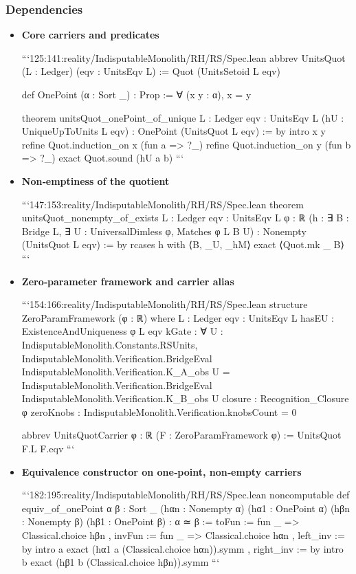 \documentclass{article}
\begin{document}
\subsubsection{Dependencies}
\begin{itemize}[leftmargin=*]
  \item \textbf{Core carriers and predicates}

```125:141:reality/IndisputableMonolith/RH/RS/Spec.lean
abbrev UnitsQuot (L : Ledger) (eqv : UnitsEqv L) := Quot (UnitsSetoid L eqv)

def OnePoint (α : Sort _) : Prop := ∀ (x y : α), x = y

theorem unitsQuot_onePoint_of_unique {L : Ledger} {eqv : UnitsEqv L}
  (hU : UniqueUpToUnits L eqv) : OnePoint (UnitsQuot L eqv) := by
  intro x y
  refine Quot.induction_on x (fun a => ?_)
  refine Quot.induction_on y (fun b => ?_)
  exact Quot.sound (hU a b)
```

  \item \textbf{Non‑emptiness of the quotient}

```147:153:reality/IndisputableMonolith/RH/RS/Spec.lean
theorem unitsQuot_nonempty_of_exists {L : Ledger} {eqv : UnitsEqv L}
  {φ : ℝ} (h : ∃ B : Bridge L, ∃ U : UniversalDimless φ, Matches φ L B U) :
  Nonempty (UnitsQuot L eqv) := by
  rcases h with ⟨B, _U, _hM⟩
  exact ⟨Quot.mk _ B⟩
```

  \item \textbf{Zero‑parameter framework and carrier alias}

```154:166:reality/IndisputableMonolith/RH/RS/Spec.lean
structure ZeroParamFramework (φ : ℝ) where
  L    : Ledger
  eqv  : UnitsEqv L
  hasEU : ExistenceAndUniqueness φ L eqv
  kGate : ∀ U : IndisputableMonolith.Constants.RSUnits,
    IndisputableMonolith.Verification.BridgeEval IndisputableMonolith.Verification.K_A_obs U
      = IndisputableMonolith.Verification.BridgeEval IndisputableMonolith.Verification.K_B_obs U
  closure : Recognition_Closure φ
  zeroKnobs : IndisputableMonolith.Verification.knobsCount = 0

abbrev UnitsQuotCarrier {φ : ℝ} (F : ZeroParamFramework φ) := UnitsQuot F.L F.eqv
```

  \item \textbf{Equivalence constructor on one‑point, non‑empty carriers}

```182:195:reality/IndisputableMonolith/RH/RS/Spec.lean
noncomputable def equiv_of_onePoint {α β : Sort _}
  (hαn : Nonempty α) (hα1 : OnePoint α)
  (hβn : Nonempty β) (hβ1 : OnePoint β) : α ≃ β :=
{ toFun := fun _ => Classical.choice hβn
, invFun := fun _ => Classical.choice hαn
, left_inv := by
    intro a
    exact (hα1 a (Classical.choice hαn)).symm
, right_inv := by
    intro b
    exact (hβ1 b (Classical.choice hβn)).symm }
```


\end{itemize}
\end{document}
